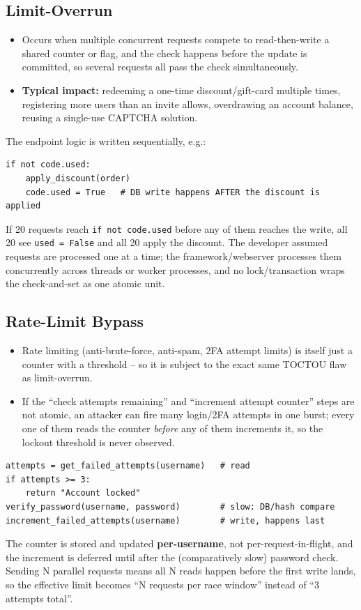 \documentclass[11pt]{article}
\begin{document}
\subsection{Limit-Overrun}
\begin{itemize}[leftmargin=1.2em]
  \item Occurs when multiple concurrent requests compete to read-then-write a shared counter or flag, and the check happens before the update is committed, so several requests all pass the check simultaneously.
  \item \textbf{Typical impact:} redeeming a one-time discount/gift-card multiple times, registering more users than an invite allows, overdrawing an account balance, reusing a single-use CAPTCHA solution.
\end{itemize}
\begin{causebox}
The endpoint logic is written sequentially, e.g.:
\begin{lstlisting}[style=code]
if not code.used:
    apply_discount(order)
    code.used = True   # DB write happens AFTER the discount is applied
\end{lstlisting}
If 20 requests reach \texttt{if not code.used} before any of them reaches the write, all 20 see \texttt{used = False} and all 20 apply the discount. The developer assumed requests are processed one at a time; the framework/webserver processes them concurrently across threads or worker processes, and no lock/transaction wraps the check-and-set as one atomic unit.
\end{causebox}

\subsection{Rate-Limit Bypass}
\begin{itemize}[leftmargin=1.2em]
  \item Rate limiting (anti-brute-force, anti-spam, 2FA attempt limits) is itself just a counter with a threshold -- so it is subject to the exact same TOCTOU flaw as limit-overrun.
  \item If the ``check attempts remaining'' and ``increment attempt counter'' steps are not atomic, an attacker can fire many login/2FA attempts in one burst; every one of them reads the counter \emph{before} any of them increments it, so the lockout threshold is never observed.
\end{itemize}
\begin{causebox}
\begin{lstlisting}[style=code]
attempts = get_failed_attempts(username)   # read
if attempts >= 3:
    return "Account locked"
verify_password(username, password)        # slow: DB/hash compare
increment_failed_attempts(username)        # write, happens last
\end{lstlisting}
The counter is stored and updated \textbf{per-username}, not per-request-in-flight, and the increment is deferred until after the (comparatively slow) password check. Sending N parallel requests means all N reads happen before the first write lands, so the effective limit becomes ``N requests per race window'' instead of ``3 attempts total''.
\end{causebox}
\end{document}
